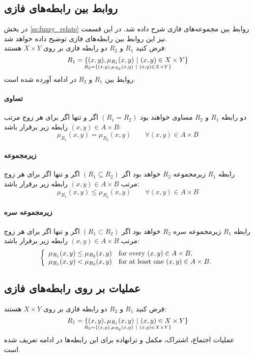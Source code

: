  \subsection{روابط بین رابطه‌های فازی}
 در بخش
 \ref{ss:fuzzy_relate}
روابط بین مجموعه‌های فازی شرح داده شد. در این قسمت نیز این روابط بین رابطه‌های فازی توضیح داده خواهد شد.\\
فرض کنید $R_1$ و $R_2$ دو رابطه فازی بر روی $X \times Y$ هستند:
$$
R_1 = \{ (x,y), \mu_{R_1}(x,y)\ |\ (x,y) \in X \times Y\}  \atop
R_2 = \{ (x,y), \mu_{R_2}(x,y)\ |\ (x,y) \in X \times Y\}
$$
روابط بین $R_1$ و $R_2$ در ادامه آورده شده است.
\paragraph{تساوی}
دو رابطه $R_1$ و $R_2$ مساوی خواهند بود $(R_1=R_2)$ اگر و تنها اگر برای هر زوج مرتب 
$(x,y) \in A \times B$
رابطه زیر برقرار باشد:
\begin{equation}\label{eq:e_frel_equality}
\mu_{R_1}(x,y) = \mu_{R_2}(x,y)\qquad \forall (x,y) \in A \times B
\end{equation}
\paragraph{زیرمجموعه}
رابطه $R_1$ زیرمجموعه $R_2$ خواهد بود اگر $(R_1 \subseteq R_2)$ اگر و تنها اگر برای هر زوج مرتب 
$(x,y) \in A \times B$
رابطه زیر برقرار باشد:
\begin{equation}\label{eq:e_frel_subseteq}
\mu_{R_1}(x,y) \leq \mu_{R_2}(x,y)\qquad \forall (x,y) \in A \times B
\end{equation}
\paragraph{زیرمجموعه سره}
رابطه $R_1$ زیرمجموعه سره $R_2$ خواهد بود اگر $(R_1 \subset R_2)$ اگر و تنها اگر برای هر زوج مرتب 
$(x,y) \in A \times B$
رابطه زیر برقرار باشد:
\begin{equation}\label{eq:e_frel_subset}
\left\{ \begin{array}{ll} 
\mu_{R_1}(x,y) \le \mu_{R_2}(x,y) &    {\rm for\ every}\ (x,y) \in A \times B, \\
\mu_{R_1}(x,y) < \mu_{R_2}(x,y) &  {\rm for\ at\ least\ one}\ (x,y) \in A \times B.
\end{array} \right.
\end{equation}
 \subsection{عملیات بر روی رابطه‌های فازی} 
فرض کنید $R_1$ و $R_2$ دو رابطه فازی بر روی $X \times Y$ هستند:
$$
R_1 = \{ (x,y), \mu_{R_1}(x,y)\ |\ (x,y) \in X \times Y\}  \atop
R_2 = \{ (x,y), \mu_{R_2}(x,y)\ |\ (x,y) \in X \times Y\}
$$
عملیات اجتماع، اشتراک، مکمل و ترانهاده برای این رابطه‌ها در ادامه تعریف شده است.
